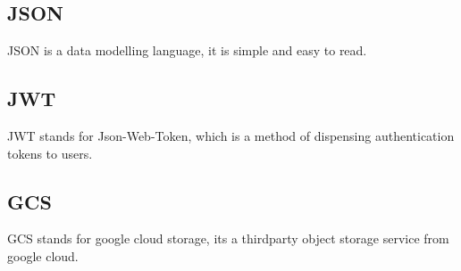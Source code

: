 \subsection{JSON}
JSON is a data modelling language, it is simple and easy to read.
\subsection{JWT}
JWT stands for Json-Web-Token, which is a method of dispensing authentication tokens to users.
\subsection{GCS}
GCS stands for google cloud storage, its a thirdparty object storage service from google cloud.